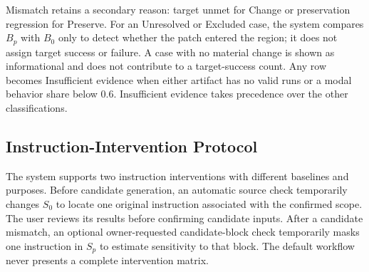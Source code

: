 Mismatch retains a secondary reason: target unmet for Change or preservation regression for Preserve. For an Unresolved or Excluded case, the system compares $B_p$ with $B_0$ only to detect whether the patch entered the region; it does not assign target success or failure. A case with no material change is shown as informational and does not contribute to a target-success count. Any row becomes Insufficient evidence when either artifact has no valid runs or a modal behavior share below 0.6. Insufficient evidence takes precedence over the other classifications.

\subsection{Instruction-Intervention Protocol}
\label{app:probe-protocol}

The system supports two instruction interventions with different baselines and purposes. Before candidate generation, an automatic source check temporarily changes $S_0$ to locate one original instruction associated with the confirmed scope. The user reviews its results before confirming candidate inputs. After a candidate mismatch, an optional owner-requested candidate-block check temporarily masks one instruction in $S_p$ to estimate sensitivity to that block. The default workflow never presents a complete intervention matrix.

